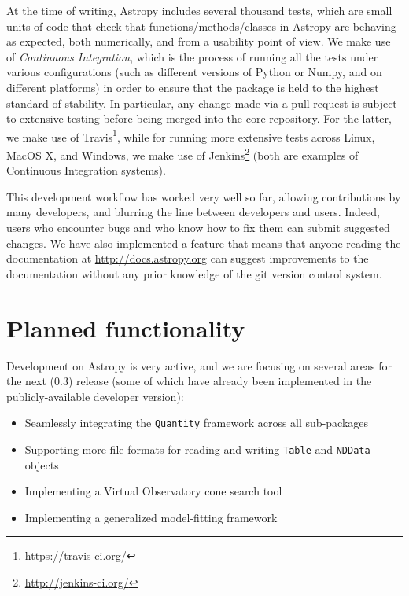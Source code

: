 \documentclass[traditabstract]{aa}
\begin{document}
At the time of writing, Astropy includes several thousand tests, which are
small units of code that check that functions/methods/classes in Astropy are
behaving as expected, both numerically, and from a usability point of view. We
make use of \textit{Continuous Integration}, which is the process of running
all the tests under various configurations (such as different versions of
Python or Numpy, and on different platforms) in order to ensure that the
package is held to the highest standard of stability. In particular, any
change made via a pull request is subject to extensive testing before being
merged into the core repository. For the latter, we make use of
Travis\footnote{\url{https://travis-ci.org/}}, while for running more
extensive tests across Linux, MacOS X, and Windows, we make use of
Jenkins\footnote{\url{http://jenkins-ci.org/}} (both are examples of Continuous Integration systems).

This development workflow has worked very well so far, allowing contributions
by many developers, and blurring the line between developers and users.
Indeed, users who encounter bugs and who know how to fix them can submit
suggested changes. We have also implemented a feature that means that anyone
reading the documentation at \url{http://docs.astropy.org} can suggest
improvements to the documentation without any prior knowledge of the
git version control system.

\section{Planned functionality}

\label{sec:future}


Development on Astropy is very active, and we are focusing on several areas
for the next (0.3) release (some of which have already been implemented in the
publicly-available developer version):

\begin{itemize}
\item Seamlessly integrating the \texttt{Quantity} framework across all sub-packages
\item Supporting more file formats for reading and writing \texttt{Table} and \texttt{NDData} objects
\item Implementing a Virtual Observatory cone search tool
\item Implementing a generalized model-fitting framework
\end{itemize}
\end{document}

